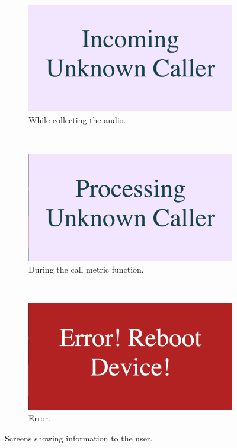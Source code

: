 \documentclass[main.tex]{subfiles}
\begin{document}
\begin{figure}[htb]
	\captionsetup[subfigure]{position=b}
        \centering
        \begin{subfigure}{0.45\textwidth}
                \includegraphics[width=\textwidth]{pics/state3}
                \caption{While collecting the audio.}
                \label{fig:state3}
        \end{subfigure}
        ~
        \begin{subfigure}{0.45\textwidth}
                \includegraphics[width=\textwidth]{pics/state5}
                \caption{During the call metric function.}
                \label{fig:state5}
        \end{subfigure}
		\\
		\begin{subfigure}{0.45\textwidth}
				\includegraphics[width=\textwidth]{pics/state9}
				\caption{Error.}
				\label{fig:state9}
		\end{subfigure}
	\caption{Screens showing information to the user.}
	\label{fig:statesmore}
\end{figure}
\end{document}
